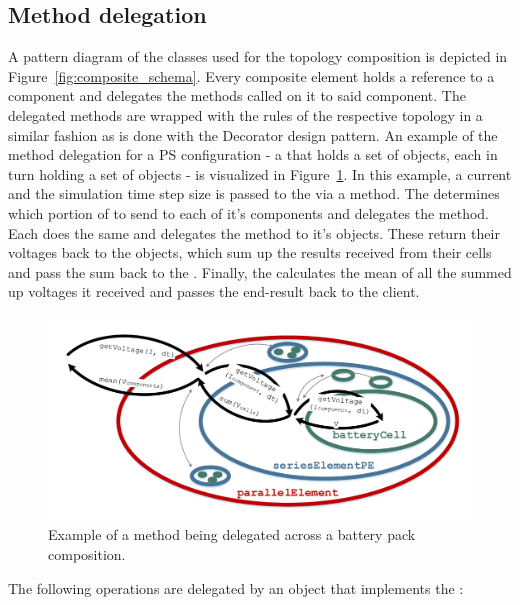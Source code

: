 \subsection{Method delegation}
\label{sec:method_delegation}
A pattern diagram of the classes used for the topology composition is depicted in Figure~\ref{fig:composite_schema}. Every composite element holds a reference to a component and delegates the methods called on it to said component. The delegated methods are wrapped with the rules of the respective topology in a similar fashion as is done with the Decorator design pattern. An example of the method delegation for a PS configuration - a  that holds a set of  objects, each in turn holding a set of  objects - is visualized in Figure~\ref{fig:method_delegation}. In this example, a current  and the simulation time step size is passed to the  via a  method. The  determines which portion of  to send to each of it's components and delegates the method. Each  does the same and delegates the method to it's  objects. These return their voltages back to the  objects, which sum up the results received from their cells and pass the sum back to the . Finally, the  calculates the mean of all the summed up voltages it received and passes the end-result back to the client.
\begin{figure}[t!]
	\captionsetup{type=figure}
	\centering
	\includegraphics[width=\textwidth]{method_delegation.pdf}
	\caption[Example of a method being delegated across a battery pack composition]{Example of a method being delegated across a battery pack composition.}
	\label{fig:method_delegation}
\end{figure}
The following operations are delegated by an object that implements the :
